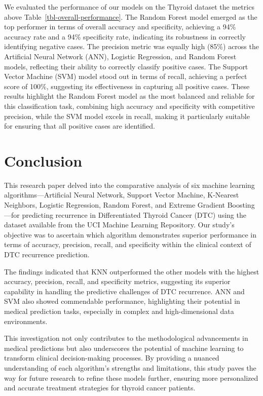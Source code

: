 \documentclass[
  letterpaper,
  DIV=11,
  numbers=noendperiod]{scrartcl}
\begin{document}
We evaluated the performance of our models on the Thyroid dataset the
metrics above Table~\ref{tbl-overall-performance}. The Random Forest
model emerged as the top performer in terms of overall accuracy and
specificity, achieving a 94\% accuracy rate and a 94\% specificity rate,
indicating its robustness in correctly identifying negative cases. The
precision metric was equally high (85\%) across the Artificial Neural
Network (ANN), Logistic Regression, and Random Forest models, reflecting
their ability to correctly classify positive cases. The Support Vector
Machine (SVM) model stood out in terms of recall, achieving a perfect
score of 100\%, suggesting its effectiveness in capturing all positive
cases. These results highlight the Random Forest model as the most
balanced and reliable for this classification task, combining high
accuracy and specificity with competitive precision, while the SVM model
excels in recall, making it particularly suitable for ensuring that all
positive cases are identified.

\section{Conclusion}\label{conclusion}

This research paper delved into the comparative analysis of six machine
learning algorithms---Artificial Neural Network, Support Vector Machine,
K-Nearest Neighbors, Logistic Regression, Random Forest, and Extreme
Gradient Boosting---for predicting recurrence in Differentiated Thyroid
Cancer (DTC) using the dataset available from the UCI Machine Learning
Repository. Our study's objective was to ascertain which algorithm
demonstrates superior performance in terms of accuracy, precision,
recall, and specificity within the clinical context of DTC recurrence
prediction.

The findings indicated that KNN outperformed the other models with the
highest accuracy, precision, recall, and specificity metrics, suggesting
its superior capability in handling the predictive challenges of DTC
recurrence. ANN and SVM also showed commendable performance,
highlighting their potential in medical prediction tasks, especially in
complex and high-dimensional data environments.

This investigation not only contributes to the methodological
advancements in medical predictions but also underscores the potential
of machine learning to transform clinical decision-making processes. By
providing a nuanced understanding of each algorithm's strengths and
limitations, this study paves the way for future research to refine
these models further, ensuring more personalized and accurate treatment
strategies for thyroid cancer patients.
\end{document}
